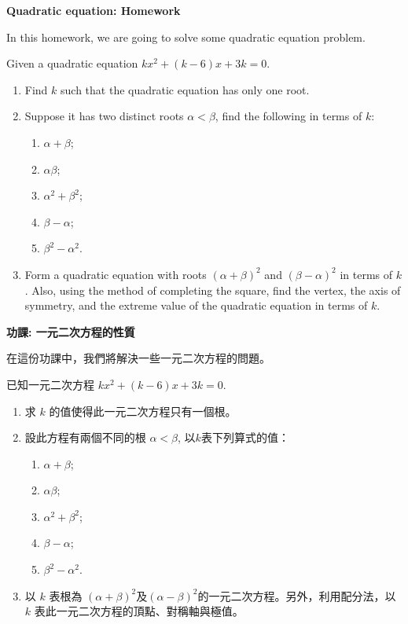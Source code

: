 \documentclass[12pt]{article}
\begin{document}
    \begin{center}
        \textbf{Quadratic equation: Homework}
    \end{center}

    In this homework, we are going to solve some quadratic equation problem.

    Given a quadratic equation $kx^2+(k-6)x+3k=0$.\begin{enumerate}
        \item Find $k$ such that the quadratic equation has only one root.
        \item Suppose it has two distinct roots $\alpha<\beta$, find the following in terms of $k$:\begin{enumerate}
            \item $\alpha+\beta$;
            \item $\alpha\beta$;
            \item $\alpha^2+\beta^2$;
            \item $\beta-\alpha$;
            \item $\beta^2-\alpha^2$.
        \end{enumerate}
        \item Form a quadratic equation with roots $(\alpha+\beta)^2$ and $(\beta-\alpha)^2$ in terms of $k$. Also, using the method of completing the square, find the vertex, the axis of symmetry, and the extreme value of the quadratic equation in terms of $k$.
    \end{enumerate}
    \newpage

    \begin{center}
        \textbf{功課: 一元二次方程的性質}
    \end{center}

    在這份功課中，我們將解決一些一元二次方程的問題。

    已知一元二次方程  $kx^2+(k-6)x+3k=0$.\begin{enumerate}
        \item 求 $k$ 的值使得此一元二次方程只有一個根。
        \item 設此方程有兩個不同的根 $\alpha<\beta$, 以$k$表下列算式的值：\begin{enumerate}
            \item $\alpha+\beta$;
            \item $\alpha\beta$;
            \item $\alpha^2+\beta^2$;
            \item $\beta-\alpha$;
            \item $\beta^2-\alpha^2$.
        \end{enumerate}
        \item 以 $k$ 表根為 $(\alpha+\beta)^2$及$(\alpha-\beta)^2$的一元二次方程。另外，利用配分法，以 $k$ 表此一元二次方程的頂點、對稱軸與極值。
    \end{enumerate}
\end{document}
